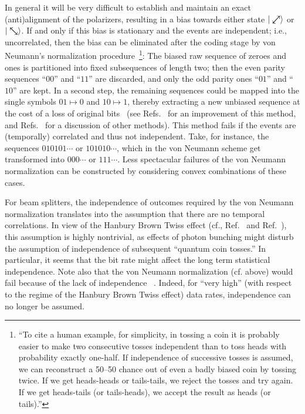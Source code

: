 \documentclass[10pt]{article}%
\begin{document}
In general it will be very difficult to establish and maintain an exact (anti)alignment of the polarizers,
resulting in a bias towards either state
$\vert \swarrow\mkern-18mu\nearrow \rangle $ or
$\vert \searrow\mkern-18mu\nwarrow  \rangle $.
If and only if this bias is stationary and the events are independent; i.e., uncorrelated,
then the bias can be eliminated after the coding stage
by von Neumann's normalization procedure~\footnote{
``To cite a human example, for simplicity, in tossing a coin it is probably easier to make two consecutive tosses independent than to toss heads with probability exactly one-half.
If independence of successive tosses is assumed, we can reconstruct a 50--50 chance out of even a badly biased coin by tossing twice.
If we get heads-heads or tails-tails, we reject the tosses and try again. If we get heads-tails (or tails-heads),
we accept the result as heads (or tails).''}:
The biased raw sequence of zeroes and ones is partitioned into
fixed subsequences of length two; then the even parity sequences ``$00$'' and ``$11$'' are discarded,
and only the odd parity ones ``$01$'' and ``$10$'' are kept.
In a second step, the remaining sequences could be mapped into the single symbols $01 \mapsto 0$ and  $10 \mapsto 1$,
thereby extracting a new unbiased sequence at the cost of a loss of original bits~\cite[p. 768]{von-neumann1}
(see Refs.~\cite{elias-72,PeresY-1992} for an improvement of this method,
and Refs.~\cite{stipcevic4442,dichtl-2007,Lacharme-2008} for a discussion of other methods).
This method fails if the events are (temporally) correlated and thus not independent. Take, for instance,
the sequences $010101 \cdots $ or $101010 \cdots $, which in the von Neumann scheme get transformed into $000\cdots$ or  $111\cdots$.
Less spectacular failures of the von Neumann normalization can be constructed by considering convex combinations of these cases.

For beam splitters, the independence of outcomes required by the von Neumann normalization translates into
the assumption that there are no temporal correlations.
In view of the Hanbury Brown Twiss effect (cf., Ref.~\cite[p.313]{chau} and Ref.~\cite[p.127 ff]{knight-qo}),
this assumption is highly nontrivial, as effects of photon bunching might disturb the assumption of independence of subsequent ``quantum coin tosses.''
In particular, it seems that the bit rate might affect the long term statistical independence.
Note also that the von Neumann normalization (cf. above) would fail because of the lack of independence~\cite[p. 768]{von-neumann1} .
Indeed, for ``very high'' (with respect to the regime of the Hanbury Brown Twiss effect) data rates, independence can no longer be assumed.
\end{document}
